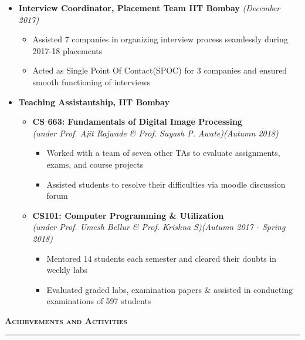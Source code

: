 \documentclass[a4paper,10pt]{article}
\newcommand{\lsep}{-0.5cm}
\newcommand{\resheading}[1]{{\small
        {
            \begin{minipage}
                {0.992\textwidth}\textbf{{\textsc{#1 \vphantom{p\^{E}} }}}
                \\[-0.3cm]
                \hrule
            \end{minipage}
            \\[-0.5cm]
        }
 }}
\begin{document}
\begin{itemize}
  \item \textbf{Interview Coordinator,
  Placement Team IIT Bombay} \emph{\hfill(December 2017)} \\[-0.6cm]
  \begin{itemize}
    \item Assisted 7 companies in organizing interview process seamlessly during 2017-18 placements
    \item Acted as Single Point Of Contact(SPOC) for 3 companies and ensured smooth functioning of interviews
  \end{itemize}
  \item \textbf{Teaching Assistantship, IIT Bombay} \\[-0.6cm]
    \begin{itemize}
         \item \textbf{CS 663: Fundamentals of Digital Image Processing} \\ \emph{(under Prof. Ajit Rajwade \& Prof. Suyash P. Awate)}\hfill \emph{(Autumn 2018)}
        \begin{itemize}
                \item Worked with a team of seven other TAs to evaluate assignments, exams, and course projects
                \item Assisted students to resolve their difficulties via moodle discussion forum
        \end{itemize} 
       \item \textbf{CS101: Computer Programming \& Utilization}\\ \emph{(under Prof. Umesh Bellur \& Prof. Krishna S)}\hfill \emph{(Autumn 2017 - Spring 2018)}
       \begin{itemize}
           \item Mentored 14 students each semester and cleared their doubts in weekly labs
    	   \item Evaluated graded labs, examination papers \& assisted in conducting examinations of 597 students
       \end{itemize} 
    \end{itemize}
\end{itemize}
\resheading{\textbf{\large Achievements and Activities}}\\[\lsep]
\\[-0.3cm]
\end{document}
